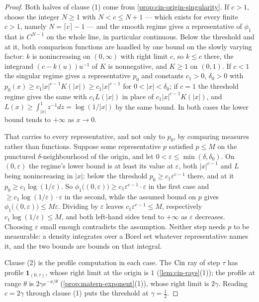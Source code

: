 \begin{proof}
\leanok
Both halves of clause (1) come from \ref{prop:cin-origin-singularity}. If $c > 1$, choose the
integer $N \ge 1$ with $N < c \le N+1$ --- which exists for every finite $c > 1$, namely
$N = \lceil c\rceil - 1$ --- and the smooth regime gives a representative of $\phi_1$ that is
$C^{N-1}$ on the whole line, in particular continuous. Below the threshold and at it, both
comparison functions are handled by one bound on the slowly varying factor: $k$ is nonincreasing
on $(0,\infty)$ with right limit $c$, so $k \le c$ there, the integrand $(c-k(u))u^{-1}$ of $K$ is
nonnegative, and $K \ge 1$ on $(0,1)$. If $c < 1$ the singular regime gives a
representative $p_0$ and constants $c_1 > 0$, $\delta_0 > 0$ with
$p_0(x) \ge c_1|x|^{c-1}K(|x|) \ge c_1|x|^{c-1}$ for $0 < |x| < \delta_0$; if $c = 1$ the
threshold regime gives the same with $c_1 L(|x|)$ in place of $c_1|x|^{c-1}K(|x|)$, and
$L(x) \ge \int_{|x|}^1 z^{-1}dz = \log(1/|x|)$ by the same bound. In both cases
the lower bound tends to $+\infty$ as $x \to 0$.

That carries to every representative, and not only to $p_0$, by comparing measures rather than
functions. Suppose some representative $p$ satisfied $p \le M$ on the punctured
$\delta$-neighbourhood of the origin, and let $0 < \varepsilon \le \min(\delta,\delta_0)$. On
$(0,\varepsilon)$ the regime's lower bound is at least its value at $\varepsilon$, both
$|x|^{c-1}$ and $L$ being nonincreasing in $|x|$: below the threshold
$p_0 \ge c_1\varepsilon^{c-1}$ there, and at it $p_0 \ge c_1\log(1/\varepsilon)$. So
$\phi_1\bigl((0,\varepsilon)\bigr) \ge c_1\varepsilon^{c-1}\cdot\varepsilon$ in the first case
and $\ge c_1\log(1/\varepsilon)\cdot\varepsilon$ in the second, while the assumed bound on $p$
gives $\phi_1\bigl((0,\varepsilon)\bigr) \le M\varepsilon$. Dividing by $\varepsilon$ leaves
$c_1\varepsilon^{c-1} \le M$, respectively $c_1\log(1/\varepsilon) \le M$, and both left-hand
sides tend to $+\infty$ as $\varepsilon$ decreases. Choosing $\varepsilon$ small enough
contradicts the assumption. Neither step needs $p$ to be measurable: a density integrates over a
Borel set whatever representative names it, and the two bounds are bounds on that integral.

Clause (2) is the profile computation in each case. The $\operatorname{Cin}$ ray of step $\tau$ has profile
$\mathbf 1_{(0,\tau)}$, whose right limit at the origin is $1$ (\ref{lem:cin-rays}(1)); the
\Matern{} profile at range $\theta$ is $2\gamma e^{-x/\theta}$ (\ref{prop:matern-exponent}(1)),
whose right limit is $2\gamma$. Reading $c = 2\gamma$ through clause (1) puts the threshold at
$\gamma = \tfrac12$.
\end{proof}

